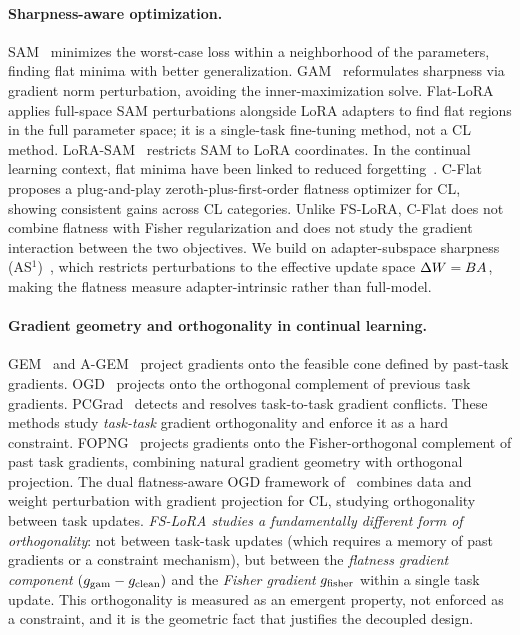 \paragraph{Sharpness-aware optimization.}
SAM~\citep{foretSharpnessAwareMinimizationEfficiently2021} minimizes the worst-case loss
within a neighborhood of the parameters, finding flat minima with better generalization.
GAM~\citep{zhengGradientAwareminimizationDistributed2021} reformulates sharpness
via gradient norm perturbation, avoiding the inner-maximization solve.
Flat-LoRA~\citep{li2024flatlora} applies full-space SAM perturbations alongside LoRA adapters
to find flat regions in the full parameter space; it is a single-task fine-tuning method,
not a CL method.
LoRA-SAM~\citep{NEURIPS2024_4eb2c0ad} restricts SAM to LoRA coordinates.
In the continual learning context, flat minima have been linked to reduced
forgetting~\citep{NEURIPS2020_518a38cc,shiOvercomingCatastrophicForgetting2021}.
C-Flat~\citep{NEURIPS2024_C-Flat} proposes a plug-and-play zeroth-plus-first-order flatness
optimizer for CL, showing consistent gains across CL categories.
Unlike FS-LoRA, C-Flat does not combine flatness with Fisher regularization and
does not study the gradient interaction between the two objectives.
We build on adapter-subspace sharpness (AS$^1$)~\citep{Anonymous2026PaperB},
which restricts perturbations to the effective update space $\Delta W = BA$,
making the flatness measure adapter-intrinsic rather than full-model.

\paragraph{Gradient geometry and orthogonality in continual learning.}
GEM~\citep{Lopez-Paz2017GEM} and A-GEM~\citep{chaudhry2019gem} project gradients onto
the feasible cone defined by past-task gradients.
OGD~\citep{farajtabar2020orthogonal} projects onto the orthogonal complement of previous
task gradients.
PCGrad~\citep{yu2020gradient} detects and resolves task-to-task gradient conflicts.
These methods study \emph{task-task} gradient orthogonality and enforce it as a hard
constraint.
FOPNG~\citep{garg2026fopng} projects gradients onto the Fisher-orthogonal complement of
past task gradients, combining natural gradient geometry with orthogonal projection.
The dual flatness-aware OGD framework of~\citet{yangRevisitingFlatnessAwareOptimization2025} combines
data and weight perturbation with gradient projection for CL, studying orthogonality
between task updates.
\emph{FS-LoRA studies a fundamentally different form of orthogonality}: not between
task-task updates (which requires a memory of past gradients or a constraint mechanism),
but between the \emph{flatness gradient component} $(g_{\mathrm{gam}} - g_{\mathrm{clean}})$ and the
\emph{Fisher gradient} $g_{\mathrm{fisher}}$ within a single task update.
This orthogonality is measured as an emergent property, not enforced as a constraint,
and it is the geometric fact that justifies the decoupled design.

